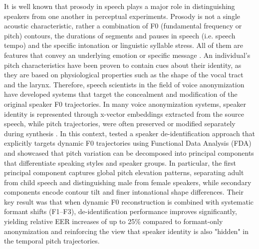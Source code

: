 \documentclass[12pt,leqno,a4paper]{article}
\begin{document}
It is well known that prosody in speech plays a major role in distinguishing speakers from one another in perceptual experiments. 
Prosody is not a single acoustic characteristic, rather a combination of F0 (fundamental frequency or pitch) contours, 
the durations of segments and pauses in speech (i.e. speech tempo) and the specific intonation or linguistic syllable stress.
All of them are features that convey an underlying emotion or specific message \citep{helander_importance_2007, mary_significance_2019}. 
An individual's pitch characteristics have been proven to contain cues about their identity, as they are based on physiological 
properties such as the shape of the vocal tract and the larynx. Therefore, speech scientists in the field of voice anonymization have developed 
systems that target the concealment and modification of the original speaker F0 trajectories. 
In many voice anonymization systems, speaker identity is represented through x-vector embeddings extracted from the source speech, while pitch 
trajectories, were often preserved or modified separately during synthesis \citep{gaznepoglu2022voiceprivacy2022descriptionspeaker}. 
In this context, \cite{Tavi_2022} tested a speaker de-identification approach that explicitly targets dynamic F0 trajectories using Functional 
Data Analysis (FDA) and showcased that pitch variation can be decomposed into principal components that differentiate speaking styles and speaker 
groups. In particular, the first principal component captures global pitch elevation patterns, separating adult from child speech and distinguishing 
male from female speakers, while secondary components encode contour tilt and finer intonational shape differences. 
Their key result was that when dynamic F0 reconstruction is combined with systematic formant shifts (F1–F3), de-identification performance improves 
significantly, yielding relative EER increases of up to 25\% compared to formant-only anonymization and reinforcing the view that speaker identity is also "hidden" in the temporal pitch trajectories.
 
\end{document}
